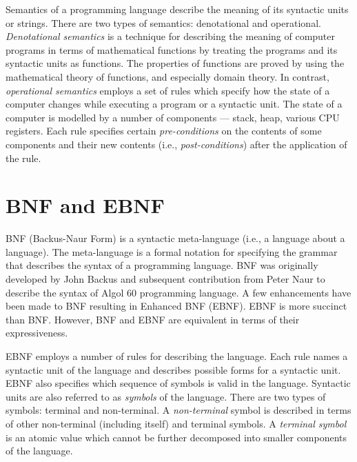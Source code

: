 Semantics of a programming language describe the meaning of its
syntactic units or strings. There are two types of semantics:
denotational and operational. \emph{Denotational semantics} is a
technique for describing the meaning of computer programs in terms
of mathematical functions by treating the programs and its
syntactic units as functions. The properties of functions are
proved by using the mathematical theory of functions, and
especially domain theory. In contrast, \emph{operational
semantics} employs a set of rules which specify how the state of a
computer changes while executing a program or a syntactic unit.
The state of a computer is modelled by a number of components ---
stack, heap, various CPU registers. Each rule specifies certain
\emph{pre-conditions} on the contents of some components and their
new contents (i.e., \emph{post-conditions}) after the application
of the rule.


{\samepage\vspace{1ex}\noindent\usebox{\phicsep}\vspace{1.5ex}}
\vspace{-0.4in}
\section{BNF and EBNF} \label{sec:EBNF}


BNF (Backus-Naur Form) is a syntactic meta-language (i.e., a
language about a language). The meta-language is a formal notation
for specifying the grammar that describes the syntax of a
programming language. BNF was originally developed by John Backus
and subsequent contribution from Peter Naur to describe the syntax
of Algol 60 programming language. A few enhancements have been
made to BNF resulting in Enhanced BNF (EBNF). EBNF is more
succinct than BNF. However, BNF and EBNF are equivalent in terms
of their expressiveness.

EBNF employs a number of rules for describing the language. Each
rule names a syntactic unit of the language and describes possible
forms for a syntactic unit. EBNF also specifies which sequence of
symbols is valid in the language. Syntactic units are also
referred to as \textit{symbols} of the language. There are two
types of symbols: terminal and non-terminal. A
\textit{non-terminal} symbol is described in terms of other
non-terminal (including itself) and terminal symbols. A
\textit{terminal symbol} is an atomic value which cannot be
further decomposed into smaller components of the language.


